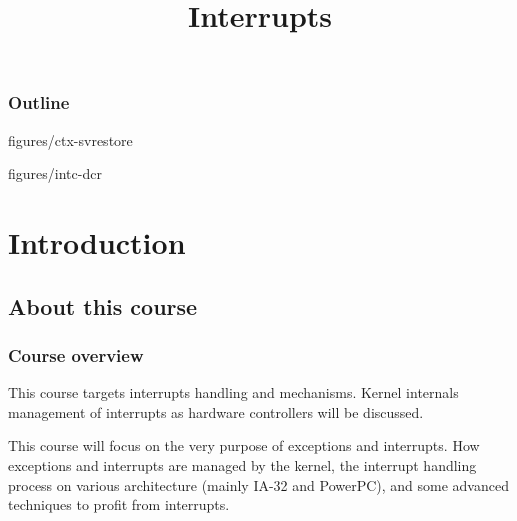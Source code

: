%
%
%
%
%
%

%
%

%
%

\def\path{../../..}

%
%



%
%

\title{Interrupts}

%
%



%
%

\begin{frame}
  \titlepage
\end{frame}

%
%

\begin{frame}
  \frametitle{Outline}

  \tableofcontents
\end{frame}

%
%

                {figures/ctx-svrestore}

                {figures/intc-dcr}


%
%

%
%

\section{Introduction}

\subsection{About this course}


\begin{frame}
  \frametitle{Course overview}

  This course targets interrupts handling and mechanisms. Kernel internals management of interrupts as hardware controllers will be discussed.

  \-

This course will focus on the very purpose of exceptions and interrupts. How exceptions and interrupts are managed by the kernel, the interrupt handling process on various architecture (mainly IA-32 and PowerPC), and some advanced techniques to profit from interrupts.

\end{frame}

